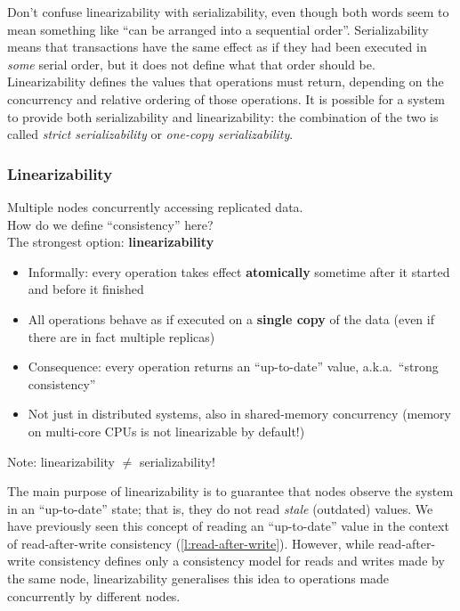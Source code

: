 Don't confuse linearizability with serializability, even though both words seem to mean something like ``can be arranged into a sequential order''.
Serializability means that transactions have the same effect as if they had been executed in \emph{some} serial order, but it does not define what that order should be.
Linearizability defines the values that operations must return, depending on the concurrency and relative ordering of those operations.
It is possible for a system to provide both serializability and linearizability: the combination of the two is called \emph{strict serializability} or \emph{one-copy serializability}.

\begin{frame}
    \label{s:linearizability}
    \frametitle{Linearizability}
    Multiple nodes concurrently accessing replicated data.\\
    How do we define ``consistency'' here?\\[1em]\pause
    The strongest option: \textbf{linearizability}\pause
    \begin{itemize}
        \item Informally: every operation takes effect \textbf{atomically} sometime after it started and before it finished\pause
        \item All operations behave as if executed on a \textbf{single copy} of the data (even if there are in fact multiple replicas)\pause
        \item Consequence: every operation returns an ``up-to-date'' value, a.k.a.\ ``strong consistency''\pause
        \item Not just in distributed systems, also in shared-memory concurrency (memory on multi-core CPUs is not linearizable by default!)\pause
    \end{itemize}
    Note: linearizability $\neq$ serializability!
\end{frame}
\label{l:linearizability}

The main purpose of linearizability is to guarantee that nodes observe the system in an ``up-to-date'' state; that is, they do not read \emph{stale} (outdated) values.
We have previously seen this concept of reading an ``up-to-date'' value in the context of read-after-write consistency (\autoref{l:read-after-write}).
However, while read-after-write consistency defines only a consistency model for reads and writes made by the same node, linearizability generalises this idea to operations made concurrently by different nodes.

